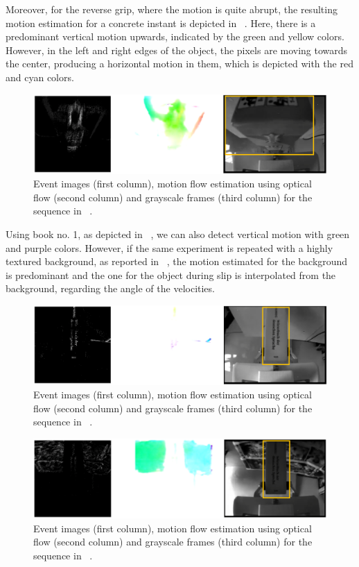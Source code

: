Moreover, for the reverse grip, where the motion is quite abrupt, the resulting motion estimation for a concrete instant is depicted in ~. Here, there is a predominant vertical motion upwards, indicated by the green and yellow colors. However, in the left and right edges of the object, the pixels are moving towards the center, producing a horizontal motion in them, which is depicted with the red and cyan colors.

\begin{figure}[H]
    \centering
    \includegraphics[width=\textwidth]{resources/images/OF_set_rev}
    \caption{Event images (first column), motion flow estimation using optical flow (second column) and grayscale frames (third column) for the sequence in ~.}\label{fig:OF_set_rev}
\end{figure}

Using book no. 1, as depicted in ~, we can also detect vertical motion with green and purple colors. However, if the same experiment is repeated with a highly textured background, as reported in ~, the motion estimated for the background is predominant and the one for the object during slip is interpolated from the background, regarding the angle of the velocities.

\begin{figure}[H]
    \centering
    \includegraphics[width=\textwidth]{resources/images/OF_hb1}
    \caption{Event images (first column), motion flow estimation using optical flow (second column) and grayscale frames (third column) for the sequence in ~.}\label{fig:OF_hb1}
\end{figure}

\begin{figure}[H]
    \centering
    \includegraphics[width=\textwidth]{resources/images/OF_hb1_tt}
    \caption{Event images (first column), motion flow estimation using optical flow (second column) and grayscale frames (third column) for the sequence in ~.}\label{fig:OF_hb1_tt}
\end{figure}

